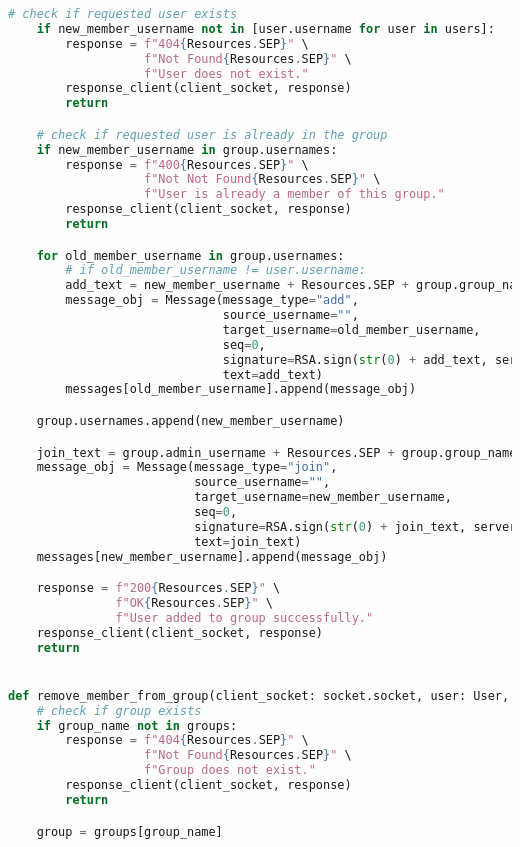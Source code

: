\begin{latin}
\begin{lstlisting}[firstnumber=234, language=Python]
    # check if requested user exists
    if new_member_username not in [user.username for user in users]:
        response = f"404{Resources.SEP}" \
                   f"Not Found{Resources.SEP}" \
                   f"User does not exist."
        response_client(client_socket, response)
        return

    # check if requested user is already in the group
    if new_member_username in group.usernames:
        response = f"400{Resources.SEP}" \
                   f"Not Not Found{Resources.SEP}" \
                   f"User is already a member of this group."
        response_client(client_socket, response)
        return

    for old_member_username in group.usernames:
        # if old_member_username != user.username:
        add_text = new_member_username + Resources.SEP + group.group_name
        message_obj = Message(message_type="add",
                              source_username="",
                              target_username=old_member_username,
                              seq=0,
                              signature=RSA.sign(str(0) + add_text, server_private_key),
                              text=add_text)
        messages[old_member_username].append(message_obj)

    group.usernames.append(new_member_username)

    join_text = group.admin_username + Resources.SEP + group.group_name + Resources.SEP + json.dumps(group.usernames)
    message_obj = Message(message_type="join",
                          source_username="",
                          target_username=new_member_username,
                          seq=0,
                          signature=RSA.sign(str(0) + join_text, server_private_key),
                          text=join_text)
    messages[new_member_username].append(message_obj)

    response = f"200{Resources.SEP}" \
               f"OK{Resources.SEP}" \
               f"User added to group successfully."
    response_client(client_socket, response)
    return


def remove_member_from_group(client_socket: socket.socket, user: User, group_name, to_be_removed_username):
    # check if group exists
    if group_name not in groups:
        response = f"404{Resources.SEP}" \
                   f"Not Found{Resources.SEP}" \
                   f"Group does not exist."
        response_client(client_socket, response)
        return

    group = groups[group_name]


\end{lstlisting}
\end{latin}
